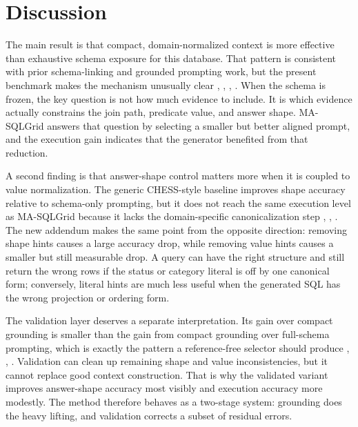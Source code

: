 \documentclass{ieeeaccess}
\begin{document}
\section{Discussion}\label{discussion}

The main result is that compact, domain-normalized context is more effective than exhaustive schema exposure for this database. That pattern is consistent with prior schema-linking and grounded prompting work, but the present benchmark makes the mechanism unusually clear \cite{lei2020reexamining}, \cite{liu2022semantic}, \cite{quamar2022natural}, \cite{xie2022unifiedskg}. When the schema is frozen, the key question is not how much evidence to include. It is which evidence actually constrains the join path, predicate value, and answer shape. MA-SQLGrid answers that question by selecting a smaller but better aligned prompt, and the execution gain indicates that the generator benefited from that reduction.

A second finding is that answer-shape control matters more when it is coupled to value normalization. The generic CHESS-style baseline improves shape accuracy relative to schema-only prompting, but it does not reach the same execution level as MA-SQLGrid because it lacks the domain-specific canonicalization step \cite{talaei2024chess}, \cite{wang2023macsql}, \cite{pourreza2023dinsql}. The new addendum makes the same point from the opposite direction: removing shape hints causes a large accuracy drop, while removing value hints causes a smaller but still measurable drop. A query can have the right structure and still return the wrong rows if the status or category literal is off by one canonical form; conversely, literal hints are much less useful when the generated SQL has the wrong projection or ordering form.

The validation layer deserves a separate interpretation. Its gain over compact grounding is smaller than the gain from compact grounding over full-schema prompting, which is exactly the pattern a reference-free selector should produce \cite{wang2021executions}, \cite{li2024select}, \cite{huang2024survey}. Validation can clean up remaining shape and value inconsistencies, but it cannot replace good context construction. That is why the validated variant improves answer-shape accuracy most visibly and execution accuracy more modestly. The method therefore behaves as a two-stage system: grounding does the heavy lifting, and validation corrects a subset of residual errors.
\end{document}
